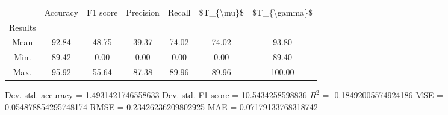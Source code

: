 \begin{tabular}{|c|c|c|c|c|c|c|}
\toprule
{} &  Accuracy &  F1 score &  Precision &  Recall &  \$T\_\{\textbackslash mu\}\$ &  \$T\_\{\textbackslash gamma\}\$ \\
Results &           &           &            &         &            &               \\
\hline
Mean    &     92.84 &     48.75 &      39.37 &   74.02 &      74.02 &         93.80 \\
Min.    &     89.42 &      0.00 &       0.00 &    0.00 &       0.00 &         89.40 \\
Max.    &     95.92 &     55.64 &      87.38 &   89.96 &      89.96 &        100.00 \\
\bottomrule
\end{tabular}

 Dev. std. accuracy = 1.4931421746558633
 Dev. std. F1-score = 10.5434258598836
 $R^2$ = -0.18492005574924186
 MSE = 0.054878854295748174
 RMSE = 0.23426236209802925
 MAE = 0.07179133768318742